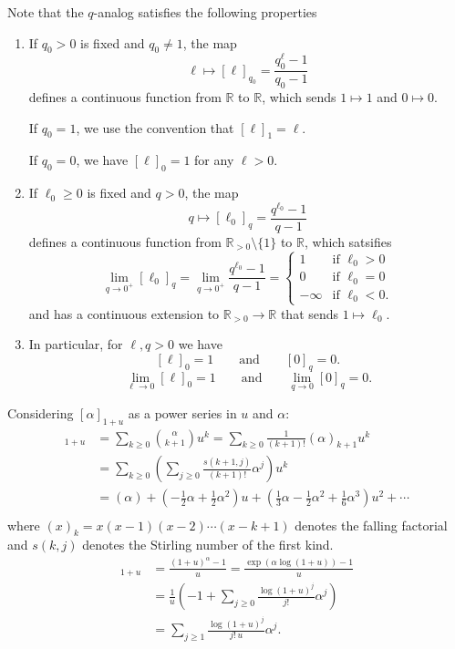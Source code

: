 \documentclass{amsart}
\theoremstyle{definition}
\newcommand{\RR}{\mathbb{R}}
\begin{document}
Note that the $q$-analog satisfies the following properties
\begin{enumerate}
\item If $q_0>0$ is fixed and $q_0 \neq 1$, the map 
$$\ell \mapsto [\ell]_{q_0} = \frac{q_0^\ell - 1}{q_0 - 1}$$
defines a continuous function from $\RR$ to $\RR$,
which sends $1 \mapsto 1$ and $0 \mapsto 0$.

If $q_0 = 1$,
we use the convention that $[\ell]_1 = \ell$.

If $q_0 = 0$,
we have $[\ell]_0 = 1$ for any $\ell > 0$.

\item If $\ell_0\geq 0$ is fixed and $q > 0$,
the map 
$$q \mapsto [\ell_0]_q = \frac{q^{\ell_0} - 1}{q - 1}$$
defines a continuous function from $\RR_{>0} \setminus\{1\}$ to $\RR$,
which satsifies
$$ \lim_{q \to 0^+} [\ell_0]_q  = 
\lim_{q \to 0^+} \frac{q^{\ell_0} - 1}{q - 1} =
\begin{cases}
 1 &\text{if } \ell_0 > 0 \\
 0 &\text{if } \ell_0 = 0 \\
 -\infty &\text{if } \ell_0 <0.
\end{cases}$$
and has a continuous extension to $\RR_{>0} \to \RR$ that sends $1 \mapsto \ell_0$.

\item 
In particular, for $\ell, q > 0$ we have
$$
[\ell]_0 = 1 
\qquad\text{and}\qquad
[0]_q = 0.
$$
$$
\lim_{\ell \to 0} [\ell]_0 = 1 
\qquad\text{and}\qquad
\lim_{q \to 0} [0]_q = 0.
$$
\end{enumerate}

Considering $[\alpha]_{1+u}$ as a power series in $u$ and $\alpha$:
\begin{align*}
[\alpha]_{1+u} &= \sum_{k\geq 0} \binom{\alpha}{k+1}u^k  
= \sum_{k\geq 0} \frac1{(k+1)!} (\alpha)_{{k+1}} u^k \\
&= \sum_{k\geq 0} \left( \sum_{j \geq 0} \frac{s(k+1,j)}{(k+1)!} \alpha^j \right) u^k \\
&= (\alpha) + (-\frac12\alpha + \frac12 \alpha^2)u + (\frac13\alpha - \frac12 \alpha^2 + \frac16 \alpha^3)u^2 + \cdots \\
\end{align*}
where $(x)_k = x(x-1)(x-2)\cdots(x-k+1)$ denotes the falling factorial and $s(k,j)$ denotes the Stirling number of the first kind.
\begin{align*}
[\alpha]_{1+u} &= \frac{(1+u)^\alpha - 1}{u}
= \frac{\exp(\alpha \log(1+u)) - 1}{u} \\
&= \frac1{u} \left( -1 + \sum_{j\geq 0} \frac{\log(1+u)^j}{j!} \alpha^j\right) \\
&= \sum_{j\geq 1} \frac{\log(1+u)^j}{j! \, u} \alpha^j .
\end{align*}
\end{document}

